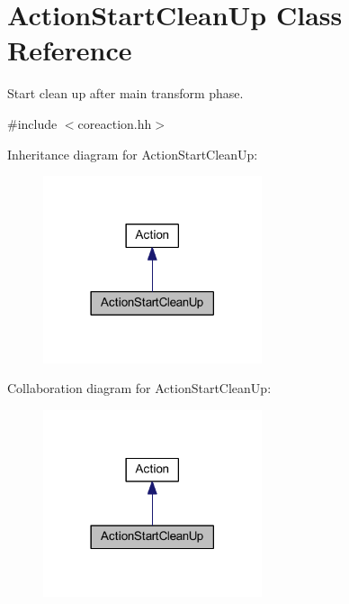 \hypertarget{class_action_start_clean_up}{}\section{Action\+Start\+Clean\+Up Class Reference}
\label{class_action_start_clean_up}


Start clean up after main transform phase.  




{\ttfamily \#include $<$coreaction.\+hh$>$}



Inheritance diagram for Action\+Start\+Clean\+Up\+:
\nopagebreak
\begin{figure}[H]
\begin{center}
\leavevmode
\includegraphics[width=182pt]{class_action_start_clean_up__inherit__graph}
\end{center}
\end{figure}


Collaboration diagram for Action\+Start\+Clean\+Up\+:
\nopagebreak
\begin{figure}[H]
\begin{center}
\leavevmode
\includegraphics[width=182pt]{class_action_start_clean_up__coll__graph}
\end{center}
\end{figure}
